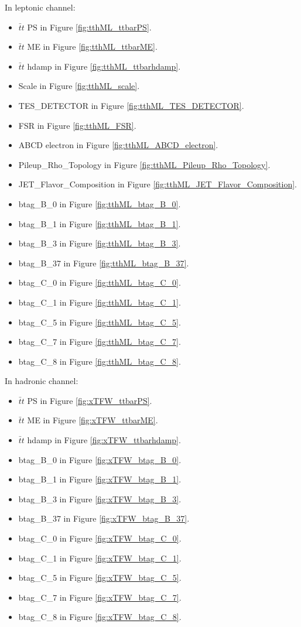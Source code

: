 In leptonic channel:
\begin{itemize}
	\item $\bar{t}t$ PS in Figure \ref{fig:tthML_ttbarPS}.
	\item $\bar{t}t$ ME in Figure \ref{fig:tthML_ttbarME}.
	\item $\bar{t}t$ hdamp in Figure \ref{fig:tthML_ttbarhdamp}.
	\item Scale in Figure \ref{fig:tthML_scale}.
	\item TES\_DETECTOR in Figure \ref{fig:tthML_TES_DETECTOR}.
	\item FSR in Figure \ref{fig:tthML_FSR}.
	\item ABCD electron in Figure \ref{fig:tthML_ABCD_electron}.
	\item Pileup\_Rho\_Topology in Figure \ref{fig:tthML_Pileup_Rho_Topology}.
	\item JET\_Flavor\_Composition in Figure \ref{fig:tthML_JET_Flavor_Composition}.
	\item btag\_B\_0 in Figure \ref{fig:tthML_btag_B_0}.
	\item btag\_B\_1 in Figure \ref{fig:tthML_btag_B_1}.
	\item btag\_B\_3 in Figure \ref{fig:tthML_btag_B_3}.
	\item btag\_B\_37 in Figure \ref{fig:tthML_btag_B_37}.
	\item btag\_C\_0 in Figure \ref{fig:tthML_btag_C_0}.
	\item btag\_C\_1 in Figure \ref{fig:tthML_btag_C_1}.
	\item btag\_C\_5 in Figure \ref{fig:tthML_btag_C_5}.
	\item btag\_C\_7 in Figure \ref{fig:tthML_btag_C_7}.
	\item btag\_C\_8 in Figure \ref{fig:tthML_btag_C_8}.

\end{itemize}

In hadronic channel:
\begin{itemize}
	\item $\bar{t}t$ PS in Figure \ref{fig:xTFW_ttbarPS}.
	\item $\bar{t}t$ ME in Figure \ref{fig:xTFW_ttbarME}.
	\item $\bar{t}t$ hdamp in Figure \ref{fig:xTFW_ttbarhdamp}.
	\item btag\_B\_0 in Figure \ref{fig:xTFW_btag_B_0}.
	\item btag\_B\_1 in Figure \ref{fig:xTFW_btag_B_1}.
	\item btag\_B\_3 in Figure \ref{fig:xTFW_btag_B_3}.
	\item btag\_B\_37 in Figure \ref{fig:xTFW_btag_B_37}.
	\item btag\_C\_0 in Figure \ref{fig:xTFW_btag_C_0}.
	\item btag\_C\_1 in Figure \ref{fig:xTFW_btag_C_1}.
	\item btag\_C\_5 in Figure \ref{fig:xTFW_btag_C_5}.
	\item btag\_C\_7 in Figure \ref{fig:xTFW_btag_C_7}.
	\item btag\_C\_8 in Figure \ref{fig:xTFW_btag_C_8}.
\end{itemize}

